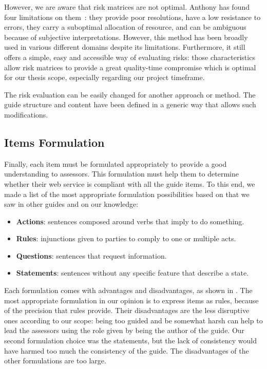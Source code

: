 However, we are aware that risk matrices are not optimal. Anthony has found four limitations on them~\cite{anthony_tonycox_whats_2008}: they provide poor resolutions, have a low resistance to errors, they carry a suboptimal allocation of resource, and can be ambiguous because of subjective interpretations. However, this method has been broadly used in various different domains despite its limitations. Furthermore, it still offers a simple, easy and accessible way of evaluating risks: those characteristics allow risk matrices to provide a great quality-time compromise which is optimal for our thesis scope, especially regarding our project timeframe.

The risk evaluation can be easily changed for another approach or method. The guide structure and content have been defined in a generic way that allows such modifications.

\subsection{Items Formulation}
\label{subsec:proposal_content_formulation}

Finally, each item must be formulated appropriately to provide a good understanding to assessors. This formulation must help them to determine whether their web service is compliant with all the guide items. To this end, we made a list of the most appropriate formulation possibilities based on that we saw in other guides and on our knowledge:
\begin{itemize}
    \item \textbf{Actions}: sentences composed around verbs that imply to do something.
    \item \textbf{Rules}: injunctions given to parties to comply to one or multiple acts.
    \item \textbf{Questions}: sentences that request information. 
    \item \textbf{Statements}: sentences without any specific feature that describe a state.
\end{itemize}

Each formulation comes with advantages and disadvantages, as shown in . The most appropriate formulation in our opinion is to express items as rules, because of the precision that rules provide. Their disadvantages are the less disruptive ones according to our scope: being too guided and be somewhat harsh can help to lead the assessors using the role given by being the author of the guide. Our second formulation choice was the statements, but the lack of consistency would have harmed too much the consistency of the guide. The disadvantages of the other formulations are too large.

